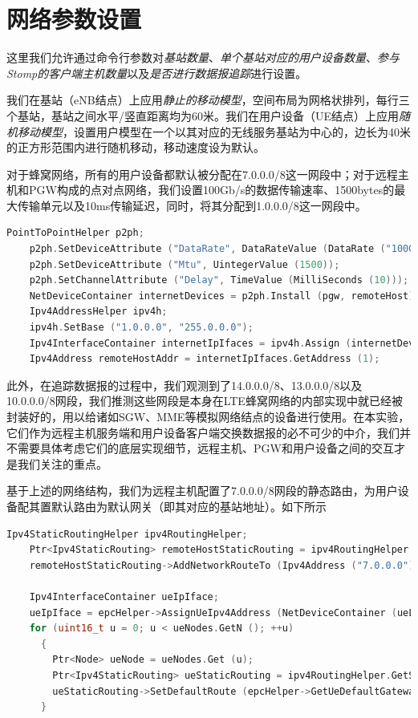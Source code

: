 \documentclass{ctexrep}
\begin{document}
	\section{网络参数设置}
	这里我们允许通过命令行参数对\textit{基站数量}、\textit{单个基站对应的用户设备数量}、\textit{参与Stomp的客户端主机数量}以及\textit{是否进行数据报追踪}进行设置。
	
	我们在基站（eNB结点）上应用\emph{静止的移动模型}，空间布局为网格状排列，每行三个基站，基站之间水平/竖直距离均为60米。我们在用户设备（UE结点）上应用\emph{随机移动模型}，设置用户模型在一个以其对应的无线服务基站为中心的，边长为40米的正方形范围内进行随机移动，移动速度设为默认。
	
	对于蜂窝网络，所有的用户设备都默认被分配在7.0.0.0/8这一网段中；对于远程主机和PGW构成的点对点网络，我们设置100Gb/s的数据传输速率、1500bytes的最大传输单元以及10ms传输延迟，同时，将其分配到1.0.0.0/8这一网段中。
	
	\begin{lstlisting}[language=c++]
    PointToPointHelper p2ph;
    p2ph.SetDeviceAttribute ("DataRate", DataRateValue (DataRate ("100Gb/s")));
    p2ph.SetDeviceAttribute ("Mtu", UintegerValue (1500));
    p2ph.SetChannelAttribute ("Delay", TimeValue (MilliSeconds (10)));
    NetDeviceContainer internetDevices = p2ph.Install (pgw, remoteHost);
    Ipv4AddressHelper ipv4h;
    ipv4h.SetBase ("1.0.0.0", "255.0.0.0");
    Ipv4InterfaceContainer internetIpIfaces = ipv4h.Assign (internetDevices);
    Ipv4Address remoteHostAddr = internetIpIfaces.GetAddress (1);
	\end{lstlisting}
	
	此外，在追踪数据报的过程中，我们观测到了14.0.0.0/8、13.0.0.0/8以及10.0.0.0/8网段，我们推测这些网段是本身在LTE蜂窝网络的内部实现中就已经被封装好的，用以给诸如SGW、MME等模拟网络结点的设备进行使用。在本实验，它们作为远程主机服务端和用户设备客户端交换数据报的必不可少的中介，我们并不需要具体考虑它们的底层实现细节，远程主机、PGW和用户设备之间的交互才是我们关注的重点。
	
	基于上述的网络结构，我们为远程主机配置了7.0.0.0/8网段的静态路由，为用户设备配其置默认路由为默认网关（即其对应的基站地址）。如下所示
	\begin{lstlisting}[language=c++]
	Ipv4StaticRoutingHelper ipv4RoutingHelper;
    Ptr<Ipv4StaticRouting> remoteHostStaticRouting = ipv4RoutingHelper.GetStaticRouting (remoteHost->GetObject<Ipv4> ());
    remoteHostStaticRouting->AddNetworkRouteTo (Ipv4Address ("7.0.0.0"), Ipv4Mask ("255.0.0.0"), 1);
    
    Ipv4InterfaceContainer ueIpIface;
    ueIpIface = epcHelper->AssignUeIpv4Address (NetDeviceContainer (ueLteDevs));
    for (uint16_t u = 0; u < ueNodes.GetN (); ++u)
      {
        Ptr<Node> ueNode = ueNodes.Get (u);
        Ptr<Ipv4StaticRouting> ueStaticRouting = ipv4RoutingHelper.GetStaticRouting (ueNode->GetObject<Ipv4> ());
        ueStaticRouting->SetDefaultRoute (epcHelper->GetUeDefaultGatewayAddress (), 1);
      }
	\end{lstlisting}
	
\end{document}

